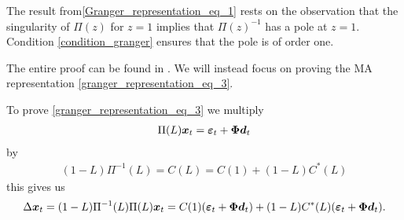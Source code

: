 \begin{bema}
    The result from\eqref{Granger_representation_eq_1} rests on the observation that the singularity of $\Pi(z)$ for $z=1$ implies that $\Pi(z)^{-1}$ has a pole at $z=1$. Condition \ref{condition_granger} ensures that the pole is of order one.
\end{bema}
\noindent The entire proof can be found in \cite{co-Integration_and_error_correction}. We will instead focus on proving the MA representation \eqref{granger_representation_eq_3}.
\begin{bevis}
    To prove \eqref{granger_representation_eq_3} we multiply 
    \begin{align*}
        \Pi(L)\boldsymbol{x}_t=\boldsymbol{\varepsilon}_t + \boldsymbol{\Phi} \boldsymbol{d}_t
    \end{align*}
    by
    \begin{align*}
        (1-L)\Pi^{-1}(L)=C(L)=C(1)+(1-L)C^\ast(L)
    \end{align*}
    this gives us
    \begin{align*}
        \Delta \boldsymbol{x}_t= (1-L)\Pi^{-1}(L)\Pi(L)\boldsymbol{x}_t=C(1)(\boldsymbol{\varepsilon}_t+\boldsymbol{\Phi} \boldsymbol{d}_t)+(1-L) C^\ast(L)(\boldsymbol{\varepsilon}_t+\boldsymbol{\Phi} \boldsymbol{d}_t).
    \end{align*}


\end{bevis}
